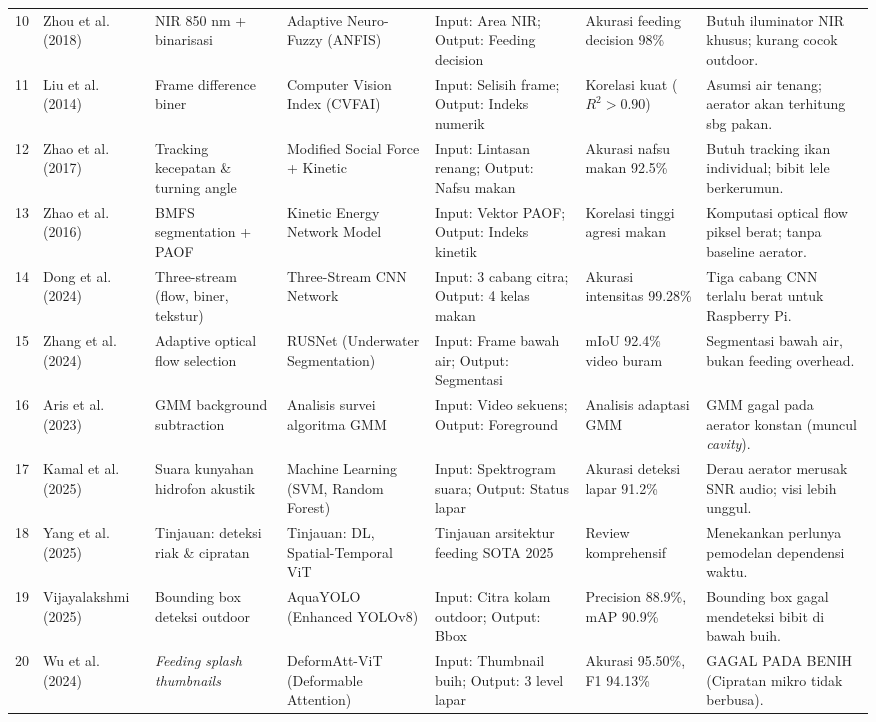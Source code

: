 \documentclass[10pt,a4paper]{article}
\begin{document}
{\begin{longtable}{@{}p{0.4cm} p{2.8cm} p{2.8cm} p{2.6cm} p{2.4cm} p{2.2cm} p{3.2cm}@{}}
10 & Zhou et al. (2018) & NIR 850 nm + binarisasi & Adaptive Neuro-Fuzzy (ANFIS) & Input: Area NIR; Output: Feeding decision & Akurasi feeding decision 98\% & Butuh iluminator NIR khusus; kurang cocok outdoor. \\
11 & Liu et al. (2014) & Frame difference biner & Computer Vision Index (CVFAI) & Input: Selisih frame; Output: Indeks numerik & Korelasi kuat ($R^2 > 0.90$) & Asumsi air tenang; aerator akan terhitung sbg pakan. \\
12 & Zhao et al. (2017) & Tracking kecepatan \& turning angle & Modified Social Force + Kinetic & Input: Lintasan renang; Output: Nafsu makan & Akurasi nafsu makan 92.5\% & Butuh tracking ikan individual; bibit lele berkerumun. \\
13 & Zhao et al. (2016) & BMFS segmentation + PAOF & Kinetic Energy Network Model & Input: Vektor PAOF; Output: Indeks kinetik & Korelasi tinggi agresi makan & Komputasi optical flow piksel berat; tanpa baseline aerator. \\
14 & Dong et al. (2024) & Three-stream (flow, biner, tekstur) & Three-Stream CNN Network & Input: 3 cabang citra; Output: 4 kelas makan & Akurasi intensitas 99.28\% & Tiga cabang CNN terlalu berat untuk Raspberry Pi. \\
15 & Zhang et al. (2024) & Adaptive optical flow selection & RUSNet (Underwater Segmentation) & Input: Frame bawah air; Output: Segmentasi & mIoU 92.4\% video buram & Segmentasi bawah air, bukan feeding overhead. \\
16 & Aris et al. (2023) & GMM background subtraction & Analisis survei algoritma GMM & Input: Video sekuens; Output: Foreground & Analisis adaptasi GMM & GMM gagal pada aerator konstan (muncul \textit{cavity}). \\
17 & Kamal et al. (2025) & Suara kunyahan hidrofon akustik & Machine Learning (SVM, Random Forest) & Input: Spektrogram suara; Output: Status lapar & Akurasi deteksi lapar 91.2\% & Derau aerator merusak SNR audio; visi lebih unggul. \\
18 & Yang et al. (2025) & Tinjauan: deteksi riak \& cipratan & Tinjauan: DL, Spatial-Temporal ViT & Tinjauan arsitektur feeding SOTA 2025 & Review komprehensif & Menekankan perlunya pemodelan dependensi waktu. \\
19 & Vijayalakshmi (2025) & Bounding box deteksi outdoor & AquaYOLO (Enhanced YOLOv8) & Input: Citra kolam outdoor; Output: Bbox & Precision 88.9\%, mAP 90.9\% & Bounding box gagal mendeteksi bibit di bawah buih. \\
20 & Wu et al. (2024) & \textit{Feeding splash thumbnails} & DeformAtt-ViT (Deformable Attention) & Input: Thumbnail buih; Output: 3 level lapar & Akurasi 95.50\%, F1 94.13\% & GAGAL PADA BENIH (Cipratan mikro tidak berbusa). \\

\end{longtable}}
\end{document}
